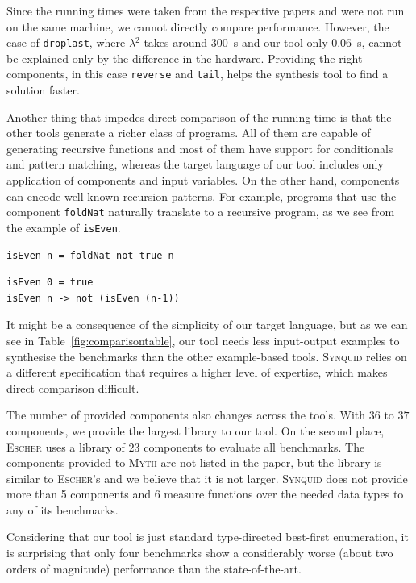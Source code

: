 Since the running times were taken from the respective papers and were not run on the same machine, we cannot directly compare performance. However, the case of \lstinline?droplast?, where \textsc{$\lambda^2$} takes around \SI{300}{s} and our tool only \SI{0.06}{s}, cannot be explained only by the difference in the hardware. Providing the right components, in this case \lstinline?reverse? and \lstinline?tail?, helps the synthesis tool to find a solution faster.

Another thing that impedes direct comparison of the running time is that the other tools generate a richer class of programs. All of them are capable of generating recursive functions and most of them have support for conditionals and pattern matching, whereas the target language of our tool includes only application of components and input variables. On the other hand, components can encode well-known recursion patterns. For example, programs that use the component \lstinline?foldNat? naturally translate to a recursive program, as we see from the example of \lstinline?isEven?.
\begin{lstlisting}[style=plain]
isEven n = foldNat not true n
\end{lstlisting}
\begin{lstlisting}[style=plain]
isEven 0 = true
isEven n -> not (isEven (n-1))
\end{lstlisting}

It might be a consequence of the simplicity of our target language, but as we can see in Table~\ref{fig:comparisontable}, our tool needs less input-output examples to synthesise the benchmarks than the other example-based tools. \textsc{Synquid} relies on a different specification that requires a higher level of expertise, which makes direct comparison difficult.

The number of provided components also changes across the tools. With $36$ to $37$ components, we provide the largest library to our tool. On the second place, \textsc{Escher} uses a library of $23$ components to evaluate all benchmarks. The components provided to \textsc{Myth} are not listed in the paper, but the library is similar to \textsc{Escher}'s and we believe that it is not larger. \textsc{Synquid} does not provide more than 5 components and 6 measure functions over the needed data types to any of its benchmarks.

Considering that our tool is just standard type-directed best-first enumeration, it is surprising that only four benchmarks show a considerably worse (about two orders of magnitude) performance than the state-of-the-art.


